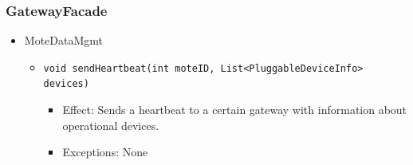     \subsubsection{GatewayFacade}
        \begin{itemize}
            \item MoteDataMgmt
            \begin{itemize}
                \item \texttt{void sendHeartbeat(int moteID, List<PluggableDeviceInfo> devices)}
                \begin{itemize}
                    \item Effect: Sends a heartbeat to a certain gateway with information about operational devices.
                    \item Exceptions: None
                \end{itemize}
            \end{itemize}


\end{itemize}
